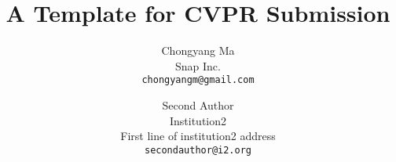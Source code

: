 \documentclass[10pt,twocolumn,letterpaper]{article}
\begin{document}
\title{A Template for CVPR Submission}

\author{Chongyang Ma\\
Snap Inc.\\
{\tt\small chongyangm@gmail.com}
\and
Second Author\\
Institution2\\
First line of institution2 address\\
{\tt\small secondauthor@i2.org}
}

\maketitle


{\small


}
\end{document}

